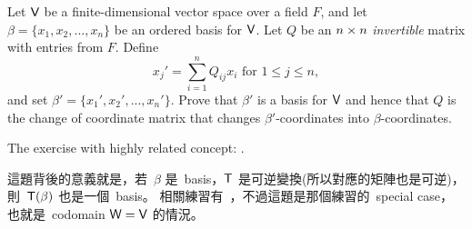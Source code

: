 \begin{exercise} \label{exercise 2.5.13}
\sloppy Let \(\textsf{V}\) be a finite-dimensional vector space over a field \(F\), and let \(\beta = \{ x_1, x_2, ..., x_n \}\) be an ordered basis for \(\textsf{V}\).
Let \(Q\) be an \(n \times n\) \emph{invertible} matrix with entries from \(F\).
Define
\[
    x_j' = \sum_{i = 1}^n Q_{ij} x_i \text{ for } 1 \le j \le n,
\]
and set \(\beta' = \{ x_1', x_2', ..., x_n' \}\).
Prove that \(\beta'\) is a basis for \(\textsf{V}\) and hence that \(Q\) is the change of coordinate matrix that changes \(\beta'\)-coordinates into \(\beta\)-coordinates.
\end{exercise}

\begin{note}
The exercise with highly related concept: .
\end{note}

\begin{note}
這題背後的意義就是，若\ \(\beta\) 是\ basis，\(\textsf{T}\) 是可逆變換(所以對應的矩陣也是可逆)，則\ \(\textsf{T}(\beta)\) 也是一個\ basis。
相關練習有\ ，不過這題是那個練習的\ special case，也就是\ codomain \(\textsf{W} = \textsf{V}\) 的情況。
\end{note}

